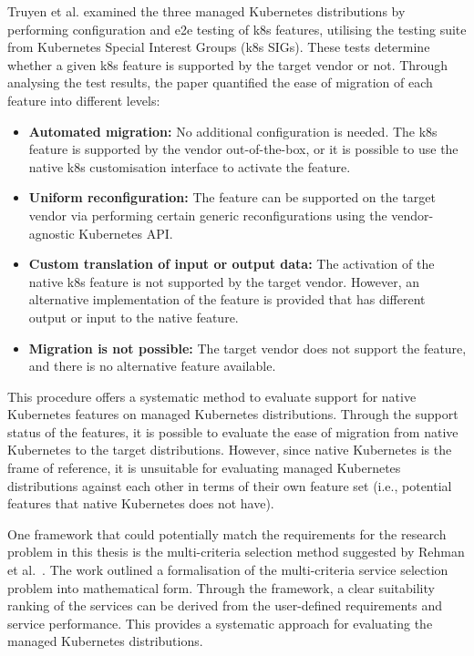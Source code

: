 Truyen et al. \cite{truyenManagingFeatureCompatibility2020} examined the three managed Kubernetes distributions by performing configuration and e2e testing of k8s features, utilising the testing suite from Kubernetes Special Interest Groups (k8s SIGs). These tests determine whether a given k8s feature is supported by the target vendor or not. Through analysing the test results, the paper quantified the ease of migration of each feature into different levels:


\begin{itemize}
\tightlist
\item
  \textbf{Automated migration:} No additional configuration is needed.
  The k8s feature is supported by the vendor out-of-the-box, or it is
  possible to use the native k8s customisation interface to activate the
  feature.
\item
  \textbf{Uniform reconfiguration:} The feature can be supported on the
  target vendor via performing certain generic reconfigurations using
  the vendor-agnostic Kubernetes API.
\item
  \textbf{Custom translation of input or output data:} The activation of
  the native k8s feature is not supported by the target vendor. However, an
  alternative implementation of the feature is provided that has
  different output or input to the native feature.
\item
  \textbf{Migration is not possible:} The target vendor does not support
  the feature, and there is no alternative feature available.
\end{itemize}

This procedure offers a systematic method to evaluate support for native Kubernetes features on managed Kubernetes distributions. Through the support status of the features, it is possible to evaluate the ease of migration from native Kubernetes to the target distributions. However, since native Kubernetes is the frame of reference, it is unsuitable for evaluating managed Kubernetes distributions against each other in terms of their own feature set (i.e., potential features that native Kubernetes does not have).


One framework
that could potentially match the requirements for the research problem in this thesis is the multi-criteria
selection method suggested by Rehman et al.~\cite{5976164}. The work outlined a formalisation of the multi-criteria service selection problem into mathematical form. Through the framework, a clear suitability ranking of the services can be derived from the user-defined requirements and service performance. This
provides a systematic approach for evaluating the managed Kubernetes distributions.

